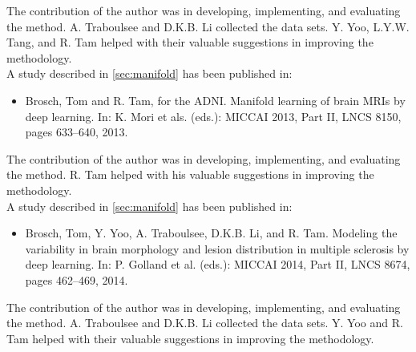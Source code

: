 The contribution of the author was in developing, implementing, and evaluating
the method. A. Traboulsee and D.K.B. Li collected the data sets. Y. Yoo, L.Y.W.
Tang, and R. Tam helped with their valuable suggestions in improving the
methodology.
\\[1em]
A study described in \ref{sec:manifold} has been published in:
\begin{itemize}
\item Brosch, Tom and R. Tam, for the ADNI. Manifold learning of brain MRIs
by deep learning. In: K. Mori et als. (eds.): MICCAI 2013, Part II, LNCS 8150,
pages 633--640, 2013.
\end{itemize}
The contribution of the author was in developing, implementing, and evaluating
the method. R. Tam helped with his valuable suggestions in improving the
methodology.
\\[1em]
A study described in \ref{sec:manifold} has been published in:
\begin{itemize}
\item Brosch, Tom, Y. Yoo, A. Traboulsee, D.K.B. Li, and R. Tam. Modeling the
variability in brain morphology and lesion distribution in multiple sclerosis by
deep learning. In: P. Golland et al. (eds.): MICCAI 2014, Part II, LNCS 8674,
pages 462--469, 2014.
\end{itemize}
The contribution of the author was in developing, implementing, and evaluating
the method. A. Traboulsee and D.K.B. Li collected the data sets. Y. Yoo and R.
Tam helped with their valuable suggestions in improving the methodology.
